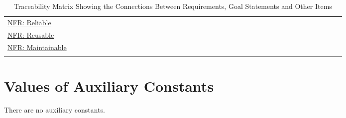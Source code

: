 \documentclass[12pt]{article}
\begin{document}
\begin{longtable}{l l l l l l l l l l l l l l l l l l l l l l l l l l l l l l l l l l l l l l l l}
\hyperref[reliable]{NFR: Reliable} &  &  &  &  &  &  &  &  &  &  &  &  &  &  &  &  &  &  &  &  &  &  &  &  &  &  &  &  &  &  &  &  &  &  &  &  &  &  & 
\\
\hyperref[reusable]{NFR: Reusable} &  &  &  &  &  &  &  &  &  &  &  &  &  &  &  &  &  &  &  &  &  &  &  &  &  &  &  &  &  &  &  &  &  &  &  &  &  &  & 
\\
\hyperref[maintainable]{NFR: Maintainable} &  &  &  &  &  &  &  &  &  &  &  &  &  &  &  &  &  &  &  &  &  &  &  &  &  &  &  &  &  &  &  &  &  &  &  &  &  &  & 
\\
\bottomrule
\caption{Traceability Matrix Showing the Connections Between Requirements, Goal Statements and Other Items}
\label{Table:TraceMatAllvsR}
\end{longtable}
\section{Values of Auxiliary Constants}
\label{Sec:AuxConstants}
There are no auxiliary constants.
\end{document}
